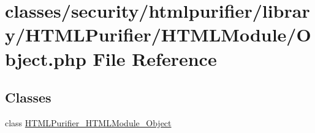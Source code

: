 \hypertarget{Object_8php}{\section{classes/security/htmlpurifier/library/\+H\+T\+M\+L\+Purifier/\+H\+T\+M\+L\+Module/\+Object.php File Reference}
\label{Object_8php}
}
\subsection*{Classes}
\begin{DoxyCompactItemize}
\item 
class \hyperlink{classHTMLPurifier__HTMLModule__Object}{H\+T\+M\+L\+Purifier\+\_\+\+H\+T\+M\+L\+Module\+\_\+\+Object}
\end{DoxyCompactItemize}
